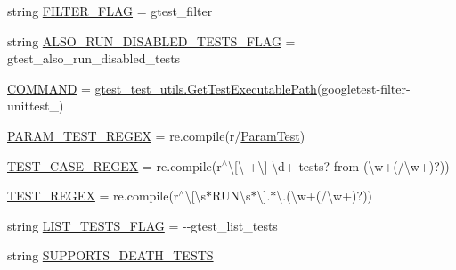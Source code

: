 \begin{DoxyCompactItemize}
\item 
string \mbox{\hyperlink{namespacegoogletest_1_1test_1_1googletest-filter-unittest_a9d2ad5cbbdc1eb9d16366deedc218d0c}{F\+I\+L\+T\+E\+R\+\_\+\+F\+L\+AG}} = \textquotesingle{}gtest\+\_\+filter\textquotesingle{}
\item 
string \mbox{\hyperlink{namespacegoogletest_1_1test_1_1googletest-filter-unittest_a1214e1e0bf0e4d18dd17a2ae9db941be}{A\+L\+S\+O\+\_\+\+R\+U\+N\+\_\+\+D\+I\+S\+A\+B\+L\+E\+D\+\_\+\+T\+E\+S\+T\+S\+\_\+\+F\+L\+AG}} = \textquotesingle{}gtest\+\_\+also\+\_\+run\+\_\+disabled\+\_\+tests\textquotesingle{}
\item 
\mbox{\hyperlink{namespacegoogletest_1_1test_1_1googletest-filter-unittest_a12a6fadcdd4067a0c25b0c02629f128d}{C\+O\+M\+M\+A\+ND}} = \mbox{\hyperlink{namespacegoogletest_1_1test_1_1gtest__test__utils_ac9af888c702350aac56b154a6af34098}{gtest\+\_\+test\+\_\+utils.\+Get\+Test\+Executable\+Path}}(\textquotesingle{}googletest-\/filter-\/unittest\+\_\+\textquotesingle{})
\item 
\mbox{\hyperlink{namespacegoogletest_1_1test_1_1googletest-filter-unittest_af75c023cf734750cc9a18436114c2282}{P\+A\+R\+A\+M\+\_\+\+T\+E\+S\+T\+\_\+\+R\+E\+G\+EX}} = re.\+compile(r\textquotesingle{}/\mbox{\hyperlink{class_param_test}{Param\+Test}}\textquotesingle{})
\item 
\mbox{\hyperlink{namespacegoogletest_1_1test_1_1googletest-filter-unittest_a9aa6da1265cde49c7c44374d71b9d54c}{T\+E\+S\+T\+\_\+\+C\+A\+S\+E\+\_\+\+R\+E\+G\+EX}} = re.\+compile(r\textquotesingle{}$^\wedge$\textbackslash{}\mbox{[}\textbackslash{}-\/+\textbackslash{}\mbox{]} \textbackslash{}d+ tests? from (\textbackslash{}w+(/\textbackslash{}w+)?)\textquotesingle{})
\item 
\mbox{\hyperlink{namespacegoogletest_1_1test_1_1googletest-filter-unittest_ac9719892052bb0bd47e89c160581d3f5}{T\+E\+S\+T\+\_\+\+R\+E\+G\+EX}} = re.\+compile(r\textquotesingle{}$^\wedge$\textbackslash{}\mbox{[}\textbackslash{}s$\ast$R\+U\+N\textbackslash{}s$\ast$\textbackslash{}\mbox{]}.$\ast$\textbackslash{}.(\textbackslash{}w+(/\textbackslash{}w+)?)\textquotesingle{})
\item 
string \mbox{\hyperlink{namespacegoogletest_1_1test_1_1googletest-filter-unittest_a92d0761e3bcb020dfdcbcb049215667a}{L\+I\+S\+T\+\_\+\+T\+E\+S\+T\+S\+\_\+\+F\+L\+AG}} = \textquotesingle{}-\/-\/gtest\+\_\+list\+\_\+tests\textquotesingle{}
\item 
string \mbox{\hyperlink{namespacegoogletest_1_1test_1_1googletest-filter-unittest_a42a1dc3f50e99fef9ecd79cf0809949c}{S\+U\+P\+P\+O\+R\+T\+S\+\_\+\+D\+E\+A\+T\+H\+\_\+\+T\+E\+S\+TS}}

\end{DoxyCompactItemize}
